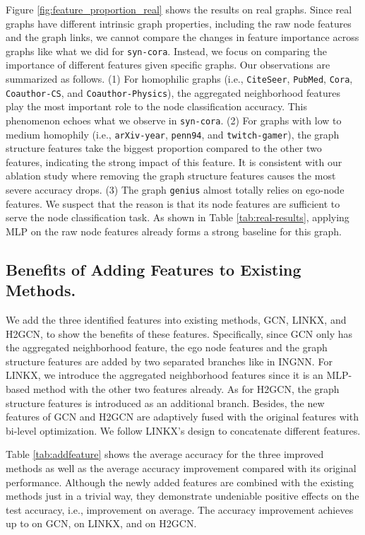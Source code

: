 \documentclass{article}
\theoremstyle{plain}
\newcommand{\pjn}{{INGNN}}
\begin{document}
Figure \ref{fig:feature_proportion_real} shows the results on real graphs. 
Since real graphs have different intrinsic graph properties, including the raw node features and the graph links, we cannot compare the changes in feature importance across graphs like what we did for \texttt{syn-cora}. Instead, we focus on comparing the importance of different features given specific graphs. Our observations are summarized as follows.
(1) For homophilic graphs (i.e., \texttt{CiteSeer}, \texttt{PubMed}, \texttt{Cora}, \texttt{Coauthor-CS}, and \texttt{Coauthor-Physics}), the aggregated neighborhood features play the most important role to the node classification accuracy. This phenomenon echoes what we observe in \texttt{syn-cora}.
(2) For graphs with low to medium homophily (i.e., \texttt{arXiv-year}, \texttt{penn94}, and \texttt{twitch-gamer}), the graph structure features take the biggest proportion compared to the other two features, indicating the strong impact of this feature. It is consistent with our ablation study where removing the graph structure features causes the most severe accuracy drops.
(3) The graph \texttt{genius} almost totally relies on ego-node features. We suspect that the reason is that its node features are sufficient to serve the node classification task. 
As shown in Table \ref{tab:real-results}, applying MLP on the raw node features already forms a strong baseline for this graph. 







\subsection{Benefits of Adding Features to Existing Methods.} \label{sec:AddAnalysis}
We add the three identified features into existing methods, GCN, LINKX, and H2GCN, to show the benefits of these features. Specifically, since GCN only has the aggregated neighborhood feature, the ego node features and the graph structure features are added by two separated branches like in \pjn. For LINKX, we introduce the aggregated neighborhood features since it is an MLP-based method with the other two features already. As for H2GCN, the graph structure features is introduced as an additional branch. Besides, the new features of GCN and H2GCN are adaptively fused with the original features with bi-level optimization. We follow LINKX's design to concatenate different features.

Table \ref{tab:addfeature} shows the average accuracy for the three improved methods as well as the average accuracy improvement compared with its original performance. Although the newly added features are combined with the existing methods just in a trivial way, they demonstrate undeniable positive effects on the test accuracy, i.e.,  improvement on average. The accuracy improvement achieves up to  on GCN,  on LINKX, and  on H2GCN.
\end{document}
